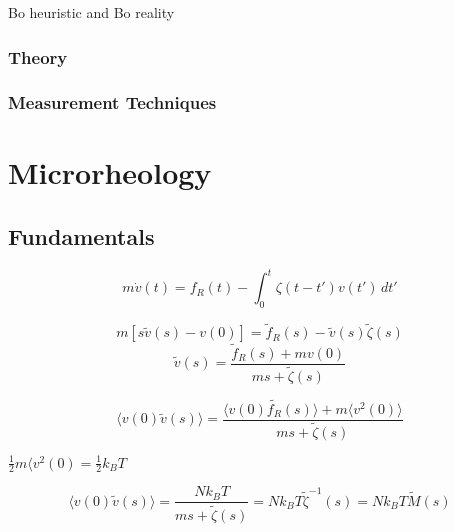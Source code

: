 Bo heuristic and Bo reality
\subsubsection{Theory}
\subsubsection{Measurement Techniques}
\section{Microrheology}
\subsection{Fundamentals}

\begin{equation}
  m\dot{v}(t) = f_R(t) - \int_0^t\zeta(t-t')v(t')\,dt'
\end{equation}

\begin{equation}
  m\left[s\tilde{v}(s) - v(0)\right] = \tilde{f}_R(s) - \tilde{v}(s)\tilde{\zeta}(s)
\end{equation}
\begin{equation}
  \tilde{v}(s) = \frac{\tilde{f}_R(s) + mv(0)}{ms + \tilde{\zeta}(s)}
\end{equation}

\begin{equation}
  \langle v(0)\tilde{v}(s) \rangle = \frac{\langle v(0)\tilde{f_R}(s)\rangle + m \langle v^2(0)\rangle}{ms + \tilde{\zeta}(s)}
\end{equation}

$\frac{1}{2}m\langle v^2(0) = \frac{1}{2}k_B T$

\begin{equation}
  \langle v(0)\tilde{v}(s) \rangle = \frac{Nk_B T}{ms + \tilde{\zeta}(s)} = Nk_B T \tilde{\zeta}^{-1}(s) = Nk_B T \tilde{M}(s)
\end{equation}

\begin{equation}
\end{equation}

\begin{equation}
\end{equation}

\begin{equation}
\end{equation}

\begin{equation}
\end{equation}

